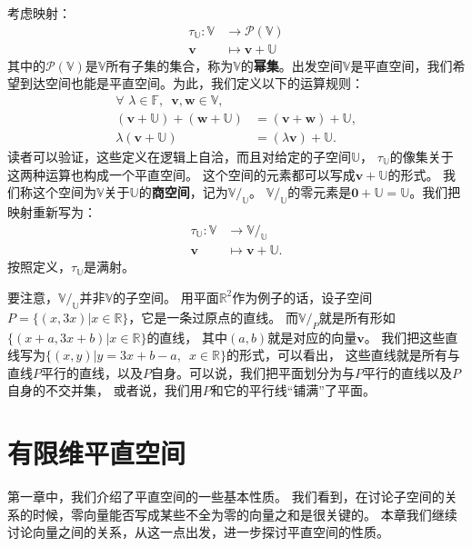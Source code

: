 \documentclass[12pt,UTF8,fontset=none]{ctexbook}
\begin{document}
考虑映射：
\begin{align*}
    \tau_\mathbb{U}: \mathbb{V} &\rightarrow \mathcal{P}(\mathbb{V})  \\
    \mathbf{v} &\mapsto \mathbf{v} + \mathbb{U}
\end{align*}
其中的$\mathcal{P}(\mathbb{V})$是$\mathbb{V}$所有子集的集合，称为$\mathbb{V}$的\textbf{幂集}。出发空间$\mathbb{V}$是平直空间，我们希望到达空间也能是平直空间。为此，我们定义以下的运算规则：
\begin{align*}
    \forall \,\,\lambda \in \mathbb{F}, \,\,\, \mathbf{v}, \mathbf{w} \in \mathbb{V}, \\
    \left(\mathbf{v} + \mathbb{U}\right) + \left(\mathbf{w} + \mathbb{U}\right) &= (\mathbf{v} + \mathbf{w}) + \mathbb{U},  \\
    \lambda \left(\mathbf{v} + \mathbb{U}\right) &= (\lambda\mathbf{v}) + \mathbb{U}. 
\end{align*}
读者可以验证，这些定义在逻辑上自洽，而且对给定的子空间$\mathbb{U}$，
$\tau_\mathbb{U}$的像集关于这两种运算也构成一个平直空间。
这个空间的元素都可以写成$\mathbf{v} + \mathbb{U}$的形式。
我们称这个空间为$\mathbb{V}$关于$\mathbb{U}$的\textbf{商空间}，记为$\mathbb{V}/_\mathbb{U}$。
$\mathbb{V}/_\mathbb{U}$的零元素是$\mathbf{0} + \mathbb{U} = \mathbb{U}$。我们把映射重新写为：
\begin{align*}
    \tau_\mathbb{U}: \mathbb{V} &\rightarrow \mathbb{V}/_\mathbb{U}  \\
    \mathbf{v} &\mapsto \mathbf{v} + \mathbb{U}.
\end{align*}
按照定义，$\tau_\mathbb{U}$是满射。

要注意，$\mathbb{V}/_\mathbb{U}$并非$\mathbb{V}$的子空间。
用平面$\mathbb{R}^2$作为例子的话，设子空间$P = \{(x, 3x) |x \in \mathbb{R}\}$，它是一条过原点的直线。
而$\mathbb{V}/_P$就是所有形如$\{(x + a, 3x + b) |x \in \mathbb{R}\}$的直线，
其中$(a, b)$就是对应的向量$\mathbf{v}$。
我们把这些直线写为$\{(x, y) |y = 3x + b - a , \,\,\,x \in \mathbb{R}\}$的形式，可以看出，
这些直线就是所有与直线$P$平行的直线，以及$P$自身。可以说，我们把平面划分为与$P$平行的直线以及$P$自身的不交并集，
或者说，我们用$P$和它的平行线“铺满”了平面。

\chapter{有限维平直空间}

第一章中，我们介绍了平直空间的一些基本性质。
我们看到，在讨论子空间的关系的时候，零向量能否写成某些不全为零的向量之和是很关键的。
本章我们继续讨论向量之间的关系，从这一点出发，进一步探讨平直空间的性质。
\end{document}
